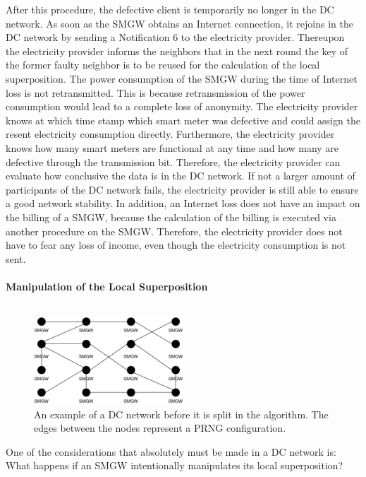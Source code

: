 After this procedure, the defective client is temporarily no longer in the DC network. As soon as the \gls{SMGW} obtains an Internet connection, it rejoins in the DC network by sending a Notification 6 to the electricity provider. Thereupon the electricity provider informs the neighbors that in the next round the key of the former faulty neighbor is to be reused for the calculation of the local superposition. The power consumption of the \gls{SMGW} during the time of Internet loss is not retransmitted. This is because retransmission of the power consumption would lead to a complete loss of anonymity. The electricity provider knows at which time stamp which smart meter was defective and could assign the resent electricity consumption directly. Furthermore, the electricity provider knows how many smart meters are functional at any time and how many are defective through the transmission bit. Therefore, the electricity provider can evaluate how conclusive the data is in the DC network. %
If not a larger amount of participants of the DC network fails, the electricity provider is still able to ensure a good network stability. %
In addition, an Internet loss does not have an impact on the billing of a \gls{SMGW}, because the calculation of the billing is executed via another procedure on the \gls{SMGW}. Therefore, the electricity provider does not have to fear any loss of income, even though the electricity consumption is not sent.\\
\\ 
\textbf{Manipulation of the Local Superposition}
\label{subsec:mani_local}
\\
\\
\begin{figure}[tbp]
  \centering
  \includegraphics[width=0.5\textwidth]{images/DC Net before Split2.png}
  \caption[Example DC Network]{An example of a DC network before it is split in the algorithm. The edges between the nodes represent a PRNG configuration.}
  \label{fig:splitDCNetwork}
\end{figure}One of the considerations that absolutely must be made in a DC network is: What happens if an \gls{SMGW} intentionally manipulates its local superposition?
